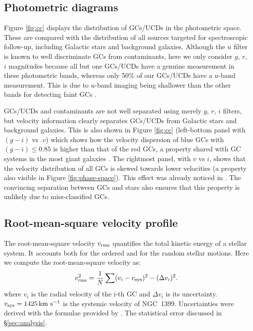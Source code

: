 \documentclass[useAMS,usenatbib]{mn2e}
\newcommand{\kms}{\mbox{\,km~s$^{-1}$}}
\begin{document}
\subsection{Photometric diagrams}


Figure \ref{fig:cc} displays the distribution of GCs/UCDs in the photometric 
space. These are compared with the distribution of all sources targeted for 
spectroscopic follow-up, including Galactic stars and background galaxies. 
Although the $u$ filter is known to well discriminate GCs from contaminants, 
here we only consider $g$, $r$, $i$ magnitudes because all but one GCs/UCDs 
have a genuine measurement in these photometric bands, whereas only 50\% of our 
GCs/UCDs have a $u$-band measurement. This is due to $u$-band imaging being 
shallower than the other bands for detecting faint GCs \citep{DAbrusco16}.

GCs/UCDs and contaminants are not well separated using merely $g$, $r$, $i$ 
filters, but velocity information clearly separates GCs/UCDs from Galactic 
stars and background galaxies. This is also shown in Figure \ref{fig:cc} 
(left-bottom panel with $(g-i)$ vs .$v$) which shows how the velocity 
dispersion of blue GCs with $(g-i) \le 0.85$ is higher than that of the red GCs, a 
property shared with GC systems in the most giant galaxies \citep[][e.g.,]{Pota13}. 
The rightmost panel, with $v$ vs $i$, shows that 
the velocity distribution of all GCs is skewed towards lower velocities (a 
property also visible in Figure \ref{fig:phase-space}). This effect was already 
noticed in \citet{Schuberth}. The convincing separation between GCs and stars 
also ensures that this property is unlikely due to miss-classified GCs. 

\subsection{Root-mean-square velocity profile}
The root-mean-square velocity $v_{\rm rms}$ quantifies the total kinetic energy 
of a stellar system. It accounts both for the ordered and for the random 
stellar motions. Here we compute the root-mean-square velocity as:
\begin{equation}
v_{\rm rms}^2 = \frac{1}{N}  \sum (v_i - v_{\rm sys})^2 - (\Delta v_i)^2 .
\label{eq:sigma}
\end{equation}
where $v_i$ is the radial velocity of the i-th GC and $\Delta v_i$ is its 
uncertainty. $v_{\rm sys}=1425 \kms$ is the systemic velocity of NGC~1399. 
Uncertainties were derived with the formulae provided by \citet{Danese}. 
The statistical error discussed in \S \ref{sec:analysis}.
\end{document}
